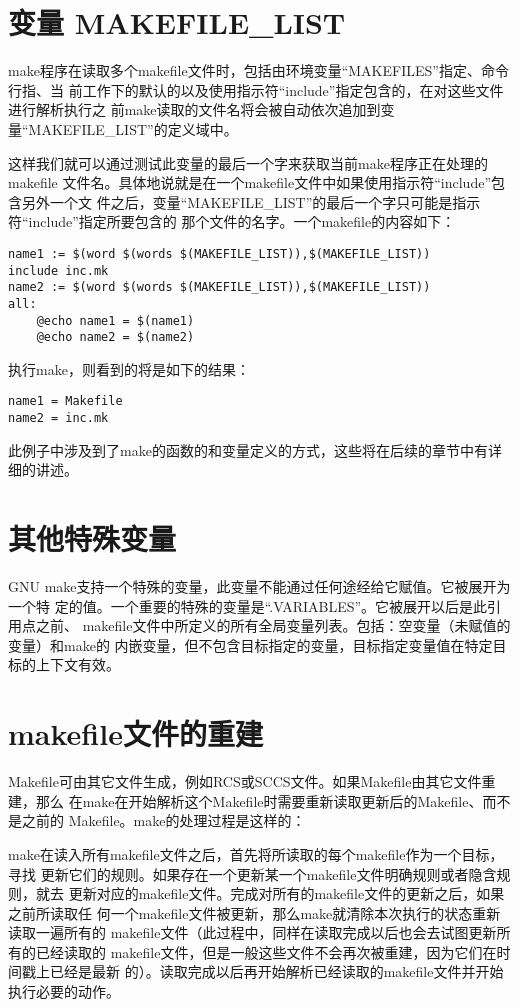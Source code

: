 \section{变量 MAKEFILE\_LIST}

make程序在读取多个makefile文件时，包括由环境变量“MAKEFILES”指定、命令行指、当
前工作下的默认的以及使用指示符“include”指定包含的，在对这些文件进行解析执行之
前make读取的文件名将会被自动依次追加到变量“MAKEFILE\_LIST”的定义域中。

这样我们就可以通过测试此变量的最后一个字来获取当前make程序正在处理的makefile
文件名。具体地说就是在一个makefile文件中如果使用指示符“include”包含另外一个文
件之后，变量“MAKEFILE\_LIST”的最后一个字只可能是指示符“include”指定所要包含的
那个文件的名字。一个makefile的内容如下：
\begin{Verbatim}[]
name1 := $(word $(words $(MAKEFILE_LIST)),$(MAKEFILE_LIST))
include inc.mk
name2 := $(word $(words $(MAKEFILE_LIST)),$(MAKEFILE_LIST))
all:
    @echo name1 = $(name1)
    @echo name2 = $(name2)
\end{Verbatim}

执行make，则看到的将是如下的结果：
\begin{Verbatim}[]
name1 = Makefile
name2 = inc.mk
\end{Verbatim}

此例子中涉及到了make的函数的和变量定义的方式，这些将在后续的章节中有详细的讲述。


\section{其他特殊变量}
GNU make支持一个特殊的变量，此变量不能通过任何途经给它赋值。它被展开为一个特
定的值。一个重要的特殊的变量是“.VARIABLES”。它被展开以后是此引用点之前、
makefile文件中所定义的所有全局变量列表。包括：空变量（未赋值的变量）和make的
内嵌变量，但不包含目标指定的变量，目标指定变量值在特定目标的上下文有效。

\section{makefile文件的重建}

Makefile可由其它文件生成，例如RCS或SCCS文件。如果Makefile由其它文件重建，那么
在make在开始解析这个Makefile时需要重新读取更新后的Makefile、而不是之前的
Makefile。make的处理过程是这样的：

make在读入所有makefile文件之后，首先将所读取的每个makefile作为一个目标，寻找
更新它们的规则。如果存在一个更新某一个makefile文件明确规则或者隐含规则，就去
更新对应的makefile文件。完成对所有的makefile文件的更新之后，如果之前所读取任
何一个makefile文件被更新，那么make就清除本次执行的状态重新读取一遍所有的
makefile文件（此过程中，同样在读取完成以后也会去试图更新所有的已经读取的
makefile文件，但是一般这些文件不会再次被重建，因为它们在时间戳上已经是最新
的）。读取完成以后再开始解析已经读取的makefile文件并开始执行必要的动作。

